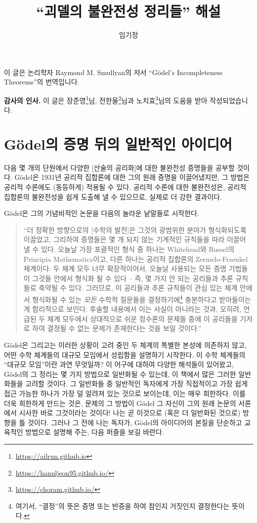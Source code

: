 \documentclass[12pt]{paper}
\title{``괴델의 불완전성 정리들'' 해설}
\author{임기정}
\begin{document}
\maketitle

이 글은 논리학자 Raymond M. Smullyan의 저서 ``G\"odel's Incompleteness Theorems''의 번역입니다.

\textbf{감사의 인사.} 이 글은 장준영\footnote{\url{https://ailrun.github.io}}님, 전한울\footnote{\url{https://hanuljeon95.github.io/}}님과 노치효\footnote{\url{https://choram.github.io/}}님의 도움을 받아 작성되었습니다.

\newpage

\section{G\"odel의 증명 뒤의 일반적인 아이디어}
\hspace{12pt}

다음 몇 개의 단원에서 다양한 [산술의 공리화]에 대한 불완전성 증명들을 공부할 것이다.
G\"odel은 1931년 공리적 집합론에 대한 그의 원래 증명을 이끌어냈지만,
그 방법은 공리적 수론에도 (동등하게) 적용될 수 있다.
공리적 수론에 대한 불완전성은,
공리적 집합론의 불완전성을 쉽게 도출해 낼 수 있으므로,
실제로 더 강한 결과이다.

G\"odel은 그의 기념비적인 논문을 다음의 놀라운 낱말들로 시작한다.

\begin{quotation}
``더 정확한 방향으로의 [수학의 발전]은 그것의 광범위한 분야가 형식화되도록 이끌었고,
그리하여 증명들은 몇 개 되지 않는 기계적인 규칙들을 따라 이끌어 낼 수 있다.
오늘날 가장 포괄적인 형식 중 하나는 Whitehead와 Russel의 Principia Mathematica이고,
다른 하나는 공리적 집합론의 Zermelo-Fraenkel 체계이다.
두 체계 모두 너무 확장적이어서,
오늘날 사용되는 모든 증명 기법들이 그것들 안에서 형식화 될 수 있다 --
즉, 몇 가지 안 되는 공리들과 추론 규칙들로 축약될 수 있다.
그러므로, 이 공리들과 추론 규칙들이 관심 있는 체계 안에서 형식화될 수 있는 \textit{모든} 수학적 질문들을 결정하기에\footnote
{
여기서, ``결정''의 뜻은 증명 또는 반증을 하여 참인지 거짓인지 결정한다는 뜻이다.
}
충분하다고 받아들이는 게 합리적으로 보인다.
후술할 내용에서 이는 사실이 아니라는 것과,
오히려, 언급된 두 체계 모두에서 상대적으로 쉬운 정수론의 문제들 중에 이 공리들을 기저로 하여 결정될 수 없는 문제가 존재한다는 것을 보일 것이다.''
\end{quotation}

G\"odel은 그리고는 이러한 상황이 고려 중인 두 체계의 특별한 본성에 의존하지 않고,
어떤 수학 체계들의 대규모 모임에서 성립함을 설명하기 시작한다.
이 수학 체계들의 ``대규모 모임''이란 과연 무엇일까?
이 어구에 대하여 다양한 해석들이 있어왔고,
G\"odel의 그 정리는 몇 가지 방법으로 일반화될 수 있는데,
이 책에서 많은 그러한 일반화들을 고려할 것이다.
그 일반화들 중 일반적인 독자에게 가장 직접적이고 가장 쉽게 접근 가능한 하나가 가장 덜 알려져 있는 것으로 보이는데,
이는 매우 희한하다.
이를 더욱 희한하게 만드는 것은,
문제의 그 방법이 G\"odel 그 자신이 그의 원래 논문의 서론에서 시사한 바로 그것이라는 것이다!
나는 곧 이것으로 (혹은 더 일반화된 것으로) 방향을 틀 것이다.
그러나 그 전에 나는 독자가,
G\"odel의 아이디어의 본질을 단순하고 교육적인 방법으로 설명해 주는,
다음 퍼즐을 보길 바란다.
\end{document}
